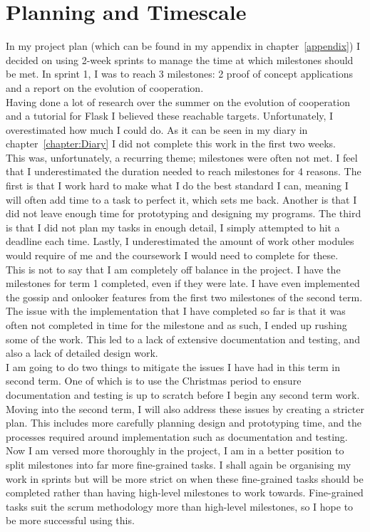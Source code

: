 \documentclass[]{final_report}
\begin{document}
\chapter{Planning and Timescale}
\label{chapter:planningtime}
In my project plan (which can be found in my appendix in chapter~\ref{appendix}) I decided on using 2-week sprints to manage the time at which milestones should be met. In sprint 1, I was to reach 3 milestones: 2 proof of concept applications and a report on the evolution of cooperation.\\
Having done a lot of research over the summer on the evolution of cooperation and a tutorial for Flask I believed these reachable targets. Unfortunately, I overestimated how much I could do. As it can be seen in my diary in chapter~\ref{chapter:Diary} I did not complete this work in the first two weeks.\\
This was, unfortunately, a recurring theme; milestones were often not met. I feel that I underestimated the duration needed to reach milestones for 4 reasons. The first is that I work hard to make what I do the best standard I can, meaning I will often add time to a task to perfect it, which sets me back. Another is that I did not leave enough time for prototyping and designing my programs. The third is that I did not plan my tasks in enough detail, I simply attempted to hit a deadline each time. Lastly, I underestimated the amount of work other modules would require of me and the coursework I would need to complete for these.\\
This is not to say that I am completely off balance in the project. I have the milestones for term 1 completed, even if they were late. I have even implemented the gossip and onlooker features from the first two milestones of the second term. The issue with the implementation that I have completed so far is that it was often not completed in time for the milestone and as such, I ended up rushing some of the work. This led to a lack of extensive documentation and testing, and also a lack of detailed design work.\\
I am going to do two things to mitigate the issues I have had in this term in second term. One of which is to use the Christmas period to ensure documentation and testing is up to scratch before I begin any second term work.\\
Moving into the second term, I will also address these issues by creating a stricter plan. This includes more carefully planning design and prototyping time, and the processes required around implementation such as documentation and testing. Now I am versed more thoroughly in the project, I am in a better position to split milestones into far more fine-grained tasks. I shall again be organising my work in sprints but will be more strict on when these fine-grained tasks should be completed rather than having high-level milestones to work towards. Fine-grained tasks suit the scrum methodology more than high-level milestones, so I hope to be more successful using this.
\end{document}
